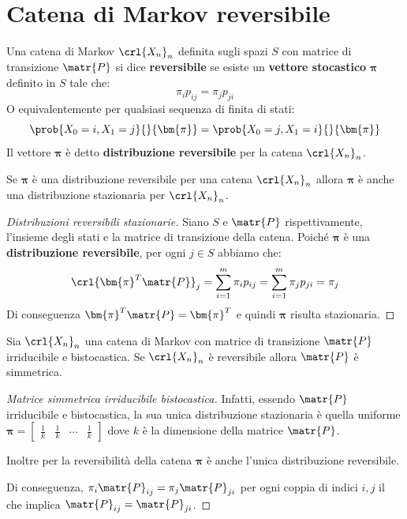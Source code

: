 \documentclass[\main/main.tex]{subfiles}
\begin{document}
\section{Catena di Markov reversibile}
\begin{definition}
  Una catena di Markov \(\crl{X_n}_n\) definita sugli spazi \(S\) con matrice di transizione \(\matr{P}\) si dice \textbf{reversibile} se esiste un \textbf{vettore stocastico} \(\bm{\pi} \) definito in \(S\) tale che:
  \[
    \pi_i p_{ij} = \pi_j p_{ji}
  \]
  O equivalentemente per qualsiasi sequenza di finita di stati:
  \[
    \prob{X_0 = i, X_1 = j}{}{\bm{\pi}} = \prob{X_0 = j, X_1 = i}{}{\bm{\pi}}
  \]
  Il vettore \(\bm{\pi} \) è detto \textbf{distribuzione reversibile} per la catena \(\crl{X_n}_n\).
\end{definition}

\begin{theorem}
  Se \(\bm{\pi} \) è una distribuzione reversibile per una catena \(\crl{X_n}_n\) allora \(\bm{\pi} \) è anche una distribuzione stazionaria per \(\crl{X_n}_n\).
\end{theorem}
\begin{proof}[Distribuzioni reversibili stazionarie]
  Siano \(S\) e \(\matr{P}\) rispettivamente, l'insieme degli stati e la matrice di transizione della catena. Poiché \(\bm{\pi} \) è una \textbf{distribuzione reversibile}, per ogni \(j \in S\) abbiamo che:
  \[
    \crl{\bm{\pi}^T \matr{P}}_j = \sum_{i=1}^m \pi_i p_{ij} = \sum_{i=1}^m \pi_j p_{ji} = \pi_j
  \]
  Di conseguenza \(\bm{\pi}^T \matr{P} = \bm{\pi}^T\) e quindi \(\bm{\pi} \) risulta stazionaria.
\end{proof}

\begin{theorem}
  Sia \(\crl{X_n}_n\) una catena di Markov con matrice di transizione \(\matr{P}\) irriducibile e bistocastica. Se \(\crl{X_n}_n\) è reversibile allora \(\matr{P}\) è simmetrica.
\end{theorem}
\begin{proof}[Matrice simmetrica irriducibile bistocastica]
  Infatti, essendo \(\matr{P}\) irriducibile e bistocastica, la sua unica distribuzione stazionaria è quella uniforme \(\bm{\pi} = \begin{bmatrix}
    \frac{1}{k} & \frac{1}{k} & \cdots & \frac{1}{k}
  \end{bmatrix}\) dove \(k\) è la dimensione della matrice \(\matr{P}\).

  Inoltre per la reversibilità della catena \(\bm{\pi} \) è anche l'unica distribuzione reversibile.

  Di conseguenza, \(\pi_i \matr{P}_{ij} = \pi_j \matr{P}_{ji}\) per ogni coppia di indici \(i,j\) il che implica \(\matr{P}_{ij} = \matr{P}_{ji}\).
\end{proof}
\end{document}
